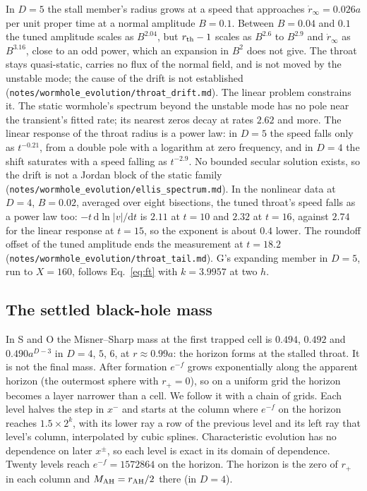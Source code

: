 \documentclass[11pt]{article}
\newcommand{\dd}{\mathrm{d}}
\newcommand{\AH}{{\rm AH}}
\begin{document}
In $D=5$ the stall member's radius grows at a speed that approaches $\dot r_\infty=0.026a$ per unit proper time at a normal
amplitude $B=0.1$. Between $B=0.04$ and $0.1$ the tuned amplitude scales as $B^{2.04}$, but $r_{\rm th}-1$ scales as $B^{2.6}$ to
$B^{2.9}$ and $\dot r_\infty$ as $B^{3.16}$, close to an odd power, which an expansion in $B^2$ does not give. The throat stays
quasi-static, carries no flux of the normal field, and is not moved by the unstable mode; the cause of the drift is not
established (\texttt{notes/wormhole\_evolution/throat\_drift.md}). The linear problem constrains it. The static wormhole's
spectrum beyond the unstable mode has no pole near the transient's fitted rate; its nearest zeros decay at rates $2.62$
and more. The linear response of the throat radius is a power law: in $D=5$ the speed falls only as $t^{-0.21}$, from a
double pole with a logarithm at zero frequency, and in $D=4$ the shift saturates with a speed falling as $t^{-2.9}$. No
bounded secular solution exists, so the drift is not a Jordan block of the static family
(\texttt{notes/wormhole\_evolution/ellis\_spectrum.md}). In the nonlinear data at $D=4$, $B=0.02$, averaged over eight
bisections, the tuned throat's speed falls as a power law too: $-t\,\dd\ln|v|/\dd t$ is $2.11$ at $t=10$ and $2.32$ at $t=16$,
against $2.74$ for the linear response at $t=15$, so the exponent is about $0.4$ lower. The roundoff offset of the tuned
amplitude ends the measurement at $t=18.2$ (\texttt{notes/wormhole\_evolution/throat\_tail.md}). G's expanding member in $D=5$, run to $X=160$, follows
Eq.~\eqref{eq:ft} with $k=3.9957$ at two $h$.

\subsection{The settled black-hole mass}\label{sec:mass}

In S and O the Misner--Sharp mass at the first trapped cell is $0.494$, $0.492$ and $0.490a^{D-3}$ in $D=4$, $5$, $6$,
at $r\approx0.99a$: the horizon forms at the stalled throat. It is not the final mass. After formation $e^{-f}$ grows exponentially along the
apparent horizon (the outermost sphere with $r_+=0$), so on a uniform grid the horizon becomes a layer narrower than a
cell. We follow it with a chain of grids. Each level halves the step in $x^-$ and starts at the column where $e^{-f}$ on
the horizon reaches $1.5\times2^k$, with its lower ray a row of the previous level and its left ray that level's column,
interpolated by cubic splines. Characteristic evolution has no dependence on later $x^\pm$, so each level is exact in
its domain of dependence. Twenty levels reach $e^{-f}=1572864$ on the horizon. The horizon is the zero of $r_+$ in each
column and $M_\AH=r_\AH/2$ there (in $D=4$).
\end{document}
